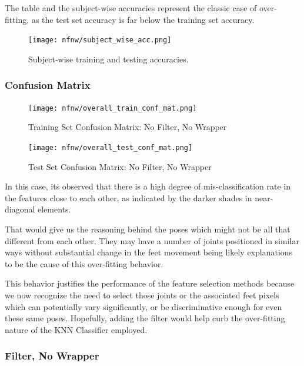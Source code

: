 \documentclass[12pt,twoside,a4paper]{article}
\begin{document}
The table and the subject-wise accuracies represent the classic case of over-fitting, as the test set accuracy is far below the training set accuracy.

\begin{figure}[H]
    \centering
    \texttt{[image: nfnw/subject\_wise\_acc.png]}
    \caption{Subject-wise training and testing accuracies.}
    \label{fig: NFW3}
\end{figure}

\subsubsection*{Confusion Matrix}

\begin{figure}[H]
    \centering
    \texttt{[image: nfnw/overall\_train\_conf\_mat.png]}
    \caption{Training Set Confusion Matrix: No Filter, No Wrapper}
    \label{fig: NFW4}
\end{figure}

\begin{figure}[H]
    \centering
    \texttt{[image: nfnw/overall\_test\_conf\_mat.png]}
    \caption{Test Set Confusion Matrix: No Filter, No Wrapper}
    \label{fig: NFW5}
\end{figure}

In this case, its observed that there is a high degree of mis-classification rate in the features close to each other, as indicated by the darker shades in near-diagonal
elements.

That would give us the reasoning behind the poses which might not be all that different from each other. They may have a number of joints positioned in similar ways without substantial change in the feet movement being likely explanations to be the cause of this over-fitting behavior.

This behavior justifies the performance of the feature selection methods because we now recognize the need to select those joints or the associated feet pixels which can potentially vary significantly, or be discriminative enough for even these same poses. Hopefully, adding the filter would help curb the over-fitting nature of the KNN Classifier employed.

\subsubsection{Filter, No Wrapper}
\end{document}
